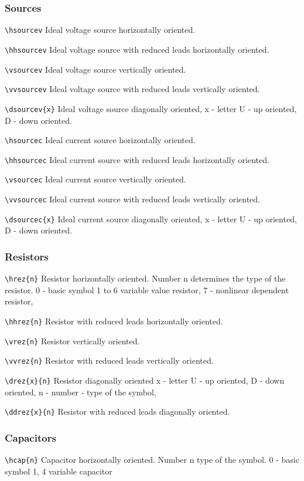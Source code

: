 \subsubsection{Sources}

\verb?\hsourcev?
Ideal voltage source horizontally oriented.

\noindent
\verb?\hhsourcev?
Ideal voltage source with reduced leads horizontally oriented.

\noindent
\verb?\vsourcev?
Ideal voltage source vertically oriented.

\noindent
\verb?\vvsourcev?
Ideal voltage source with reduced leads vertically oriented.

\noindent
\verb?\dsourcev{x}?
Ideal voltage source diagonally oriented, x - letter U -
up oriented, D - down oriented.

\noindent
\verb?\hsourcec?
Ideal current source horizontally oriented.

\noindent
\verb?\hhsourcec?
Ideal current source with reduced leads horizontally oriented.

\noindent
\verb?\vsourcec?
Ideal current source vertically oriented.

\noindent
\verb?\vvsourcec?
Ideal current source with reduced leads vertically oriented.

\noindent
\verb?\dsourcec{x}?
Ideal current source diagonally oriented, x - letter U -
up oriented, D - down oriented.

\subsubsection{Resistors}
\verb?\hrez{n}?
Resistor horizontally oriented. Number n determines the type of
the resistor.
0 - basic symbol
1 to 6 variable value resistor,
7 - nonlinear dependent resistor,

\noindent
\verb?\hhrez{n}?
Resistor with reduced leads horizontally oriented.

\noindent
\verb?\vrez{n}?
Resistor vertically oriented.

\noindent
\verb?\vvrez{n}?
Resistor with reduced leads vertically oriented.

\noindent
\verb?\drez{x}{n}?
Resistor diagonally oriented x - letter U -
up oriented, D - down oriented, n - number - type of the symbol,

\noindent
\verb?\ddrez{x}{n}?
Resistor with reduced leads diagonally oriented.


\subsubsection{Capacitors}
\verb?\hcap{n}?
Capacitor horizontally oriented. Number n type of the symbol.
0 - basic symbol
1, 4 variable capacitor


